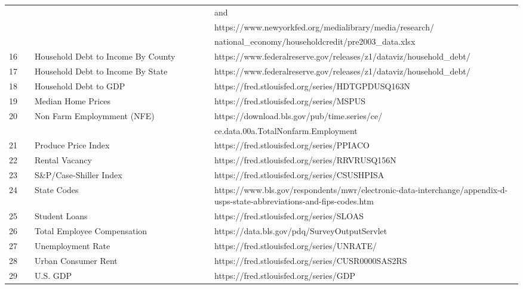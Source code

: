 \documentclass[sigconf,nonacm,11pt]{acmart}
\begin{document}
\begin{appendix}
\begin{table}[ht]
\begin{tabular}{p{0.05\linewidth}p{0.35\linewidth}p{0.6\linewidth}}
 & & and\\
 & & https://www.newyorkfed.org/medialibrary/media/research/\\
 & & national\_economy/householdcredit/pre2003\_data.xlsx\\
16 & Household Debt to Income By County & https://www.federalreserve.gov/releases/z1/dataviz/household\_debt/\\
17 & Household Debt to Income By State  & https://www.federalreserve.gov/releases/z1/dataviz/household\_debt/\\
18 & Household Debt to GDP & https://fred.stlouisfed.org/series/HDTGPDUSQ163N\\
19 & Median Home Prices & https://fred.stlouisfed.org/series/MSPUS\\
20 & Non Farm Employmment (NFE) & https://download.bls.gov/pub/time.series/ce/\\
 & & ce.data.00a.TotalNonfarm.Employment\\
21 & Produce Price Index  & https://fred.stlouisfed.org/series/PPIACO\\
22 & Rental Vacancy & https://fred.stlouisfed.org/series/RRVRUSQ156N\\
23 & S\&P/Case-Shiller Index & https://fred.stlouisfed.org/series/CSUSHPISA\\
24 & State Codes & https://www.bls.gov/respondents/mwr/electronic-data-interchange/appendix-d-usps-state-abbreviations-and-fips-codes.htm\\
25 & Student Loans & https://fred.stlouisfed.org/series/SLOAS\\
26 & Total Employee Compensation & https://data.bls.gov/pdq/SurveyOutputServlet\\
27 & Unemployment Rate & https://fred.stlouisfed.org/series/UNRATE/\\
28 & Urban Consumer Rent & https://fred.stlouisfed.org/series/CUSR0000SAS2RS\\
29 & U.S. GDP  & https://fred.stlouisfed.org/series/GDP\\
\hline
\end{tabular}
\end{table}





\end{appendix}
\end{document}
